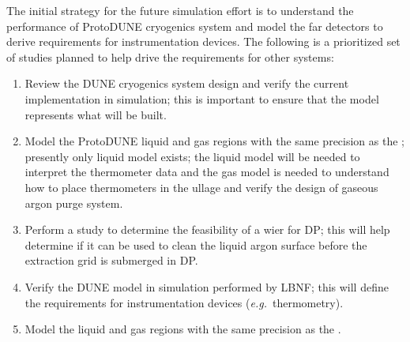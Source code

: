 The initial strategy for the future  simulation effort is to understand the performance of ProtoDUNE cryogenics system and model the far detectors to derive requirements for instrumentation devices.
The following is a prioritized set of studies planned to help drive the requirements for other systems:
\begin{enumerate}
\item Review the DUNE  cryogenics system design and verify the current implementation in simulation; this is important to ensure that the model represents what will be built.
\item Model the ProtoDUNE liquid and gas regions with the same precision as the ; presently only liquid model exists; the liquid model will be needed to interpret the thermometer data and the gas model is needed to understand how to place thermometers in the ullage and verify the design of gaseous argon purge system.
\item Perform a  study to determine the feasibility of a wier for DP; this will help determine if it can be used to clean the liquid argon surface before the extraction grid is submerged in DP.
\item Verify the DUNE  \single {} model in simulation performed by LBNF; this will define the requirements for instrumentation devices ({\em e.g.}\ thermometry).
\item Model the  liquid and gas regions with the same precision as the .
\end{enumerate}